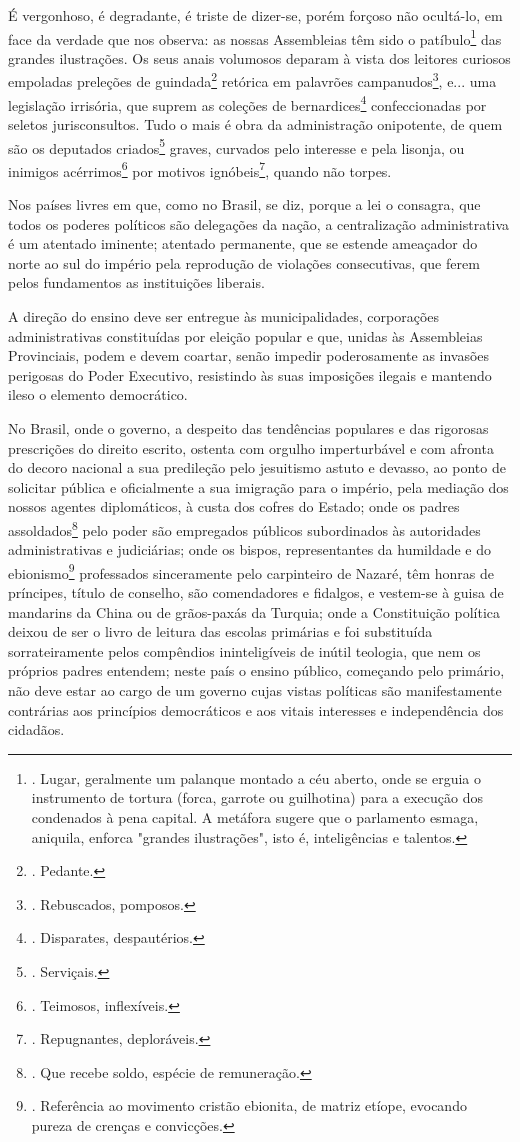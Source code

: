 É vergonhoso, é degradante, é triste de dizer-se, porém forçoso não
ocultá-lo, em face da verdade que nos observa: as nossas Assembleias têm
sido o patíbulo\footnote{. Lugar, geralmente um palanque montado a céu
  aberto, onde se erguia o instrumento de tortura (forca, garrote ou
  guilhotina) para a execução dos condenados à pena capital. A metáfora
  sugere que o parlamento esmaga, aniquila, enforca "grandes
  ilustrações", isto é, inteligências e talentos.} das grandes
ilustrações. Os seus anais volumosos deparam à vista dos leitores
curiosos empoladas preleções de guindada\footnote{. Pedante.} retórica
em palavrões campanudos\footnote{. Rebuscados, pomposos.}, e... uma
legislação irrisória, que suprem as coleções de bernardices\footnote{.
  Disparates, despautérios.} confeccionadas por seletos jurisconsultos.
Tudo o mais é obra da administração onipotente, de quem são os deputados
criados\footnote{. Serviçais.} graves, curvados pelo interesse e pela
lisonja, ou inimigos acérrimos\footnote{. Teimosos, inflexíveis.} por
motivos ignóbeis\footnote{. Repugnantes, deploráveis.}, quando não
torpes.

Nos países livres em que, como no Brasil, se diz, porque a lei o
consagra, que todos os poderes políticos são delegações da nação, a
centralização administrativa é um atentado iminente; atentado
permanente, que se estende ameaçador do norte ao sul do império pela
reprodução de violações consecutivas, que ferem pelos fundamentos as
instituições liberais.

A direção do ensino deve ser entregue às municipalidades, corporações
administrativas constituídas por eleição popular e que, unidas às
Assembleias Provinciais, podem e devem coartar, senão impedir
poderosamente as invasões perigosas do Poder Executivo, resistindo às
suas imposições ilegais e mantendo ileso o elemento democrático.

No Brasil, onde o governo, a despeito das tendências populares e das
rigorosas prescrições do direito escrito, ostenta com orgulho
imperturbável e com afronta do decoro nacional a sua predileção pelo
jesuitismo astuto e devasso, ao ponto de solicitar pública e
oficialmente a sua imigração para o império, pela mediação dos nossos
agentes diplomáticos, à custa dos cofres do Estado; onde os padres
assoldados\footnote{. Que recebe soldo, espécie de remuneração.} pelo
poder são empregados públicos subordinados às autoridades
administrativas e judiciárias; onde os bispos, representantes da
humildade e do ebionismo\footnote{. Referência ao movimento cristão
  ebionita, de matriz etíope, evocando pureza de crenças e convicções.}
professados sinceramente pelo carpinteiro de Nazaré, têm honras de
príncipes, título de conselho, são comendadores e fidalgos, e vestem-se
à guisa de mandarins da China ou de grãos-paxás da Turquia; onde a
Constituição política deixou de ser o livro de leitura das escolas
primárias e foi substituída sorrateiramente pelos compêndios
ininteligíveis de inútil teologia, que nem os próprios padres entendem;
neste país o ensino público, começando pelo primário, não deve estar ao
cargo de um governo cujas vistas políticas são manifestamente contrárias
aos princípios democráticos e aos vitais interesses e independência dos
cidadãos.

